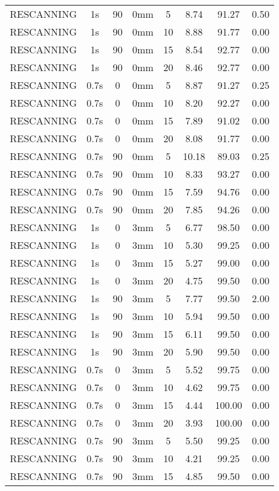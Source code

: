 \begin{table}[H]
\begin{tabular}{|c||c|c|c|c||c|c|c|}
RESCANNING & 1s & 90 & 0mm & 5 & 8.74 & 91.27 & 0.50 \\
RESCANNING & 1s & 90 & 0mm & 10 & 8.88 & 91.77 & 0.00 \\
RESCANNING & 1s & 90 & 0mm & 15 & 8.54 & 92.77 & 0.00 \\
RESCANNING & 1s & 90 & 0mm & 20 & 8.46 & 92.77 & 0.00 \\
RESCANNING & 0.7s & 0 & 0mm & 5 & 8.87 & 91.27 & 0.25 \\
RESCANNING & 0.7s & 0 & 0mm & 10 & 8.20 & 92.27 & 0.00 \\
RESCANNING & 0.7s & 0 & 0mm & 15 & 7.89 & 91.02 & 0.00 \\
RESCANNING & 0.7s & 0 & 0mm & 20 & 8.08 & 91.77 & 0.00 \\
RESCANNING & 0.7s & 90 & 0mm & 5 & 10.18 & 89.03 & 0.25 \\
RESCANNING & 0.7s & 90 & 0mm & 10 & 8.33 & 93.27 & 0.00 \\
RESCANNING & 0.7s & 90 & 0mm & 15 & 7.59 & 94.76 & 0.00 \\
RESCANNING & 0.7s & 90 & 0mm & 20 & 7.85 & 94.26 & 0.00 \\
RESCANNING & 1s & 0 & 3mm & 5 & 6.77 & 98.50 & 0.00 \\
RESCANNING & 1s & 0 & 3mm & 10 & 5.30 & 99.25 & 0.00 \\
RESCANNING & 1s & 0 & 3mm & 15 & 5.27 & 99.00 & 0.00 \\
RESCANNING & 1s & 0 & 3mm & 20 & 4.75 & 99.50 & 0.00 \\
RESCANNING & 1s & 90 & 3mm & 5 & 7.77 & 99.50 & 2.00 \\
RESCANNING & 1s & 90 & 3mm & 10 & 5.94 & 99.50 & 0.00 \\
RESCANNING & 1s & 90 & 3mm & 15 & 6.11 & 99.50 & 0.00 \\
RESCANNING & 1s & 90 & 3mm & 20 & 5.90 & 99.50 & 0.00 \\
RESCANNING & 0.7s & 0 & 3mm & 5 & 5.52 & 99.75 & 0.00 \\
RESCANNING & 0.7s & 0 & 3mm & 10 & 4.62 & 99.75 & 0.00 \\
RESCANNING & 0.7s & 0 & 3mm & 15 & 4.44 & 100.00 & 0.00 \\
RESCANNING & 0.7s & 0 & 3mm & 20 & 3.93 & 100.00 & 0.00 \\
RESCANNING & 0.7s & 90 & 3mm & 5 & 5.50 & 99.25 & 0.00 \\
RESCANNING & 0.7s & 90 & 3mm & 10 & 4.21 & 99.25 & 0.00 \\
RESCANNING & 0.7s & 90 & 3mm & 15 & 4.85 & 99.50 & 0.00 \\

\end{tabular}
\end{table}
